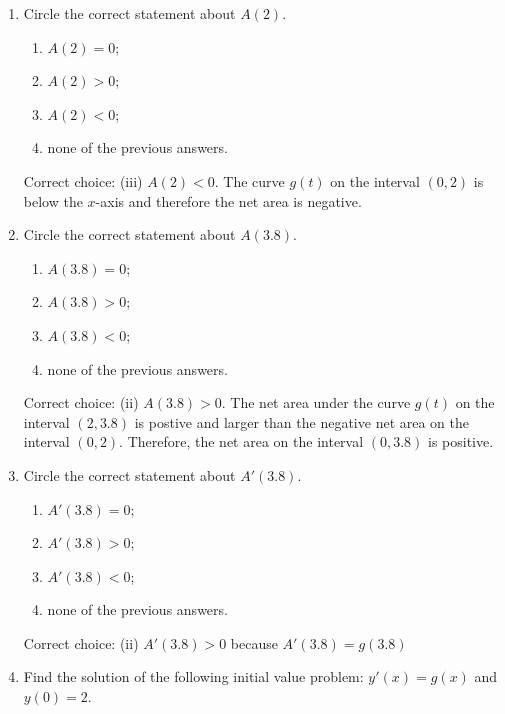 \documentclass{ximera}
\begin{document}
\begin{problem}
\begin{enumerate}
    \item
      Circle the correct statement about $A(2)$.
      \begin{enumerate}
        \item $A(2) = 0$;
        \item $A(2) > 0$;
        \item $A(2) < 0$;
        \item none of the previous answers.
      \end{enumerate}
      \begin{explanation}
        Correct choice: (iii) $A(2) < 0$.  The curve $g(t)$ on the interval $(0,2)$ is below the $x$-axis and therefore the net area is negative.
      \end{explanation}
    \item
      Circle the correct statement about $A(3.8)$.
      \begin{enumerate}
        \item $A(3.8) = 0$;
        \item $A(3.8) > 0$;
        \item $A(3.8) < 0$;
        \item none of the previous answers.
      \end{enumerate}
      \begin{explanation}
        Correct choice: (ii) $A(3.8) > 0$.  The net area under the curve $g(t)$ on the interval $(2,3.8)$ is postive and larger than the negative net area on the interval $(0,2)$.  Therefore, the net area on the interval $(0,3.8)$ is positive.
      \end{explanation}
    \item
      Circle the correct statement about $A'(3.8)$.
      \begin{enumerate}
        \item $A'(3.8) = 0$;
        \item $A'(3.8) > 0$;
        \item $A'(3.8) < 0$;
        \item none of the previous answers.
      \end{enumerate}
      \begin{explanation}
        Correct choice: (ii) $A'(3.8) > 0$ because $A'(3.8)=g(3.8)$
      \end{explanation}
    \item
      Find the solution of the following initial value problem: $y'(x) = g(x)$ and $y(0) = 2$.
      \begin{enumerate}

\end{enumerate}
\end{enumerate}
\end{problem}
\end{document}
